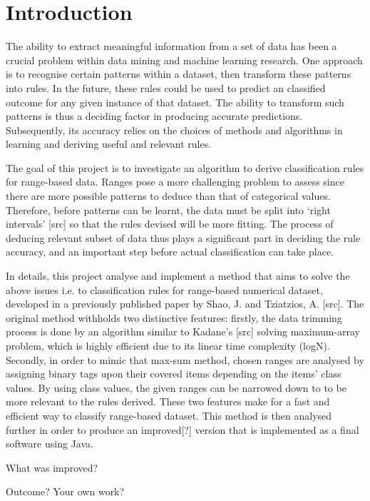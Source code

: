 \chapter{Introduction}

The ability to extract meaningful information from a set of data has been a crucial problem within data mining and machine learning research. One approach is to recognise certain patterns within a dataset, then transform these patterns into rules. In the future, these rules could be used to predict an classified outcome for any given instance of that dataset. The ability to transform such patterns is thus a deciding factor in producing accurate predictions. Subsequently, its accuracy relies on the choices of methods and algorithms in learning and deriving useful and relevant rules. 

The goal of this project is to investigate an algorithm to derive classification rules for range-based data. Ranges pose a more challenging problem to assess since there are more possible patterns to deduce than that of categorical values. Therefore, before patterns can be learnt, the data must be split into `right intervals' [src] so that the rules devised will be more fitting. The process of deducing relevant subset of data thus plays a significant part in deciding the rule accuracy, and an important step before actual classification can take place. 


In details, this project analyse and implement a method that aims to solve the above issues i.e. to classification rules for range-based numerical dataset, developed in a previously published paper by Shao, J. and Tziatzios, A. [src]. The original method withholds two distinctive features: firstly, the data trimming process is done by an algorithm similar to Kadane's [src] solving maximum-array problem, which is highly efficient due to its linear time complexity (logN). Secondly, in order to mimic that max-sum method, chosen ranges are analysed by assigning binary tags upon their covered items depending on the items' class values. By using class values, the given ranges can be narrowed down to to be more relevant to the rules derived. These two features make for a fast and efficient way to classify range-based dataset. This method is then analysed further in order to produce an improved[?] version that is implemented as a final software using Java. 

What was improved? 

Outcome? Your own work? 


